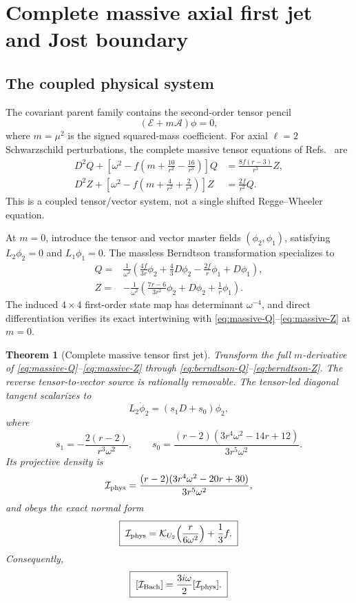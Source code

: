 \documentclass[11pt]{article}
\newtheorem{theorem}{Theorem}[section]
\theoremstyle{remark}
\begin{document}
\section{Complete massive axial first jet and Jost boundary}
\label{sec:mass}

\subsection{The coupled physical system}

The covariant parent family contains the second-order tensor pencil
\[
 (\mathcal E+m\mathcal A)\phi=0,
\]
where \(m=\mu^2\) is the signed squared-mass coefficient.  For axial
\(\ell=2\) Schwarzschild perturbations, the complete massive tensor
equations of Refs.~\cite{britocardosopani2013,antoniou2025} are
\begin{align}
 D^2Q+
 \left[\omega^2-f\left(m+\frac{10}{r^2}-\frac{16}{r^3}\right)\right]Q
 &=\frac{8f(r-3)}{r^3}Z,
 \label{eq:massive-Q}\\
 D^2Z+
 \left[\omega^2-f\left(m+\frac4{r^2}+\frac2{r^3}\right)\right]Z
 &=\frac{2f}{r^2}Q.
 \label{eq:massive-Z}
\end{align}
This is a coupled tensor/vector system, not a single shifted
Regge--Wheeler equation.

At \(m=0\), introduce the tensor and vector master fields
\((\phi_2,\phi_1)\), satisfying \(L_2\phi_2=0\) and \(L_1\phi_1=0\).
The massless Berndtson transformation specializes to
\begin{align}
 Q={}&\frac1{\omega^2}\left(
 \frac{4f}{3r}\phi_2+\frac43D\phi_2
 -\frac{2f}{r}\phi_1+D\phi_1\right),\label{eq:berndtson-Q}\\
 Z={}&-\frac1{\omega^2}\left(
 \frac{7r-6}{3r^2}\phi_2+D\phi_2+\frac1r\phi_1\right).
\label{eq:berndtson-Z}
\end{align}
The induced \(4\times4\) first-order state map has determinant
\(\omega^{-4}\), and direct differentiation verifies its exact
intertwining with \eqref{eq:massive-Q}--\eqref{eq:massive-Z} at \(m=0\).

\begin{theorem}[Complete massive tensor first jet]\label{thm:mass-jet}
Transform the full \(m\)-derivative of
\eqref{eq:massive-Q}--\eqref{eq:massive-Z} through
\eqref{eq:berndtson-Q}--\eqref{eq:berndtson-Z}.  The reverse
tensor-to-vector source is rationally removable.  The tensor-led diagonal
tangent scalarizes to
\[
 L_2\dot\phi_2=(s_1D+s_0)\phi_2,
\]
where
\[
 s_1=-\frac{2(r-2)}{r^3\omega^2},\qquad
 s_0=\frac{(r-2)(3r^4\omega^2-14r+12)}
 {3r^5\omega^2}.
\]
Its projective density is
\[
 \mathcal I_{\rm phys}
 =\frac{(r-2)(3r^4\omega^2-20r+30)}
 {3r^5\omega^2},
\]
and obeys the exact normal form
\begin{equation}\label{eq:physical-mass-normal}
 \boxed{\;
 \mathcal I_{\rm phys}
 =\mathcal K_{U_2}\!\left(\frac{r}{6\omega^2}\right)
 +\frac13f.
 \;}
\end{equation}
Consequently,
\begin{equation}\label{eq:complete-mass-crosswalk}
 \boxed{\;
 [\mathcal I_{\rm Bach}]
 =\frac{3i\omega}{2}[\mathcal I_{\rm phys}].
 \;}
\end{equation}
\end{theorem}
\end{document}
